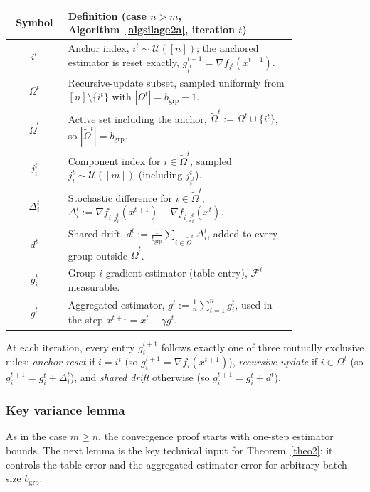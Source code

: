 \documentclass{article}
\newcommand{\eqdef}{:=}
\theoremstyle{plain}
\begin{document}
\begin{center}
\small
\renewcommand{\arraystretch}{1.25}
\begin{tabular}{@{}c@{\quad}p{0.80\linewidth}@{}}
\toprule
Symbol & Definition (case $n>m$, Algorithm~\ref{algsilage2a}, iteration $t$) \\
\midrule
$i^t$ & Anchor index, $i^t\sim\mathcal{U}([n])$; the anchored estimator is reset exactly, $g_{i^t}^{t+1}=\nabla f_{i^t}(x^{t+1})$. \\
$\Omega^t$ & Recursive-update subset, sampled uniformly from $[n]\setminus\{i^t\}$ with $|\Omega^t|=b_{\mathrm{grp}}-1$. \\
$\tilde{\Omega}^t$ & Active set including the anchor, $\tilde{\Omega}^t\eqdef\Omega^t\cup\{i^t\}$, so $|\tilde{\Omega}^t|=b_{\mathrm{grp}}$. \\
$j_i^t$ & Component index for $i\in\tilde{\Omega}^t$, sampled $j_i^t\sim\mathcal{U}([m])$ (including $j_{i^t}^t$). \\
$\Delta_i^t$ & Stochastic difference for $i\in\tilde{\Omega}^t$, $\Delta_i^t\eqdef\nabla f_{i,j_i^t}(x^{t+1})-\nabla f_{i,j_i^t}(x^t)$. \\
$d^t$ & Shared drift, $d^t\eqdef\frac{1}{b_{\mathrm{grp}}}\sum_{i\in\tilde{\Omega}^t}\Delta_i^t$, added to every group outside $\tilde{\Omega}^t$. \\
$g_i^t$ & Group-$i$ gradient estimator (table entry), $\mathcal{F}^t$-measurable. \\
$g^t$ & Aggregated estimator, $g^t\eqdef\frac{1}{n}\sum_{i=1}^n g_i^t$, used in the step $x^{t+1}=x^t-\gamma g^t$. \\
\bottomrule
\end{tabular}
\end{center}

At each iteration, every entry $g_i^{t+1}$ follows exactly one of three mutually exclusive rules: \emph{anchor reset} if $i=i^t$ (so $g_i^{t+1}=\nabla f_i(x^{t+1})$), \emph{recursive update} if $i\in\Omega^t$ (so $g_i^{t+1}=g_i^t+\Delta_i^t$), and \emph{shared drift} otherwise (so $g_i^{t+1}=g_i^t+d^t$).

\subsubsection*{Key variance lemma}

As in the case $m\ge n$, the convergence proof starts with one-step estimator bounds.
The next lemma is the key technical input for Theorem~\ref{theo2}: it controls the table error and the aggregated estimator error for arbitrary batch size $b_{\mathrm{grp}}$.
\end{document}
